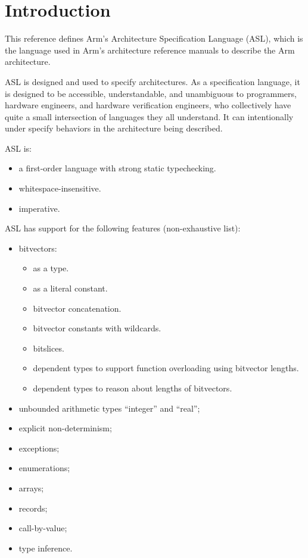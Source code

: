 \chapter{Introduction\label{chap:Introduction}}

This reference defines Arm’s Architecture Specification Language (ASL), which is the language
used in Arm’s architecture reference manuals to describe the Arm architecture.

ASL is designed and used to specify architectures. As a specification language, it is designed to be accessible,
understandable, and unambiguous to programmers, hardware
engineers, and hardware verification engineers, who collectively have quite a small intersection of languages they
all understand. It can intentionally under specify behaviors in the architecture being described.

ASL is:
\begin{itemize}
    \item a first-order language with strong static typechecking.
    \item whitespace-insensitive.
    \item imperative.
\end{itemize}

ASL has support for the following features (non-exhaustive list):
\begin{itemize}
    \item bitvectors:
    \begin{itemize}
        \item as a type.
        \item as a literal constant.
        \item bitvector concatenation.
        \item bitvector constants with wildcards.
        \item bitslices.
        \item dependent types to support function overloading using bitvector lengths.
        \item dependent types to reason about lengths of bitvectors.
    \end{itemize}
    \item unbounded arithmetic types “integer” and “real”;
    \item explicit non-determinism;
    \item exceptions;
    \item enumerations;
    \item arrays;
    \item records;
    \item call-by-value;
    \item type inference.
\end{itemize}

